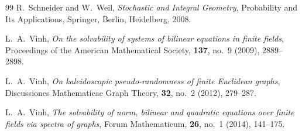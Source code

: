\documentclass[11pt]{article}
\theoremstyle{remark}
\numberwithin{equation}{section}
\newcommand{\1}{\mathbf 1}
\begin{document}
\begin{thebibliography}{99}
R.~Schneider and W.~Weil,
\emph{Stochastic and Integral Geometry},
Probability and Its Applications, Springer, Berlin, Heidelberg, 2008.

L.~A.~Vinh,
\emph{On the solvability of systems of bilinear equations in finite
fields},
Proceedings of the American Mathematical Society, \textbf{137},
no.~9 (2009), 2889--2898.

L.~A.~Vinh,
\emph{On kaleidoscopic pseudo-randomness of finite Euclidean graphs},
Discussiones Mathematicae Graph Theory, \textbf{32}, no.~2 (2012),
279--287.

L.~A.~Vinh,
\emph{The solvability of norm, bilinear and quadratic equations over
finite fields via spectra of graphs},
Forum Mathematicum, \textbf{26}, no.~1 (2014), 141--175.

\end{thebibliography}
\end{document}
